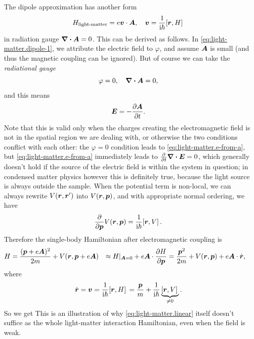 \documentclass[hyperref, a4paper, 12pt]{report}
\newcommand*{\ii}{\mathrm{i}}
\def\\{}%
\begin{document}
The dipole approximation has another form
\begin{equation}
    H_{\text{light-matter}} = e \vb*{v} \cdot \vb*{A}, 
    \quad \vb*{v} = \frac{1}{\ii \hbar} \comm*{\vb*{r}}{H} 
\end{equation}
in radiation gauge $\div{\vb*{A}} = 0$.
This can be derived as follows. 
In \eqref{eq:light-matter.dipole-1}, 
we attribute the electric field to $\varphi$, 
and assume $\vb*{A}$ is small (and thus the magnetic coupling can be ignored).
But of course we can take the \emph{radiational gauge} 
\begin{equation}
    \varphi = 0, \quad \div{\vb*{A}} = 0,
\end{equation} 
and this means 
\begin{equation}
    \vb*{E} = - \pdv{\vb*{A}}{t}.
    \label{eq:light-matter.e-from-a}
\end{equation}
Note that this is valid only when 
the charges creating the electromagnetic field 
is not in the spatial region we are dealing with,
or otherwise the two conditions conflict with each other: 
the $\varphi = 0$ condition leads to \eqref{eq:light-matter.e-from-a}, 
but \eqref{eq:light-matter.e-from-a} immediately leads to $\pdv{t} \div{\vb*{E}} = 0$, 
which generally doesn't hold if the source of the electric field 
is within the system in question; 
in condensed matter physics however this is definitely true, 
because the light source is always outside the sample.
When the potential term is non-local, 
we can always rewrite $V(\vb*{r}, \vb*{r}')$
into $V(\vb*{r}, \vb*{p})$,
and with appropriate normal ordering, we have 
\[
    \pdv{\vb*{p}} V(\vb*{r}, \vb*{p}) = \frac{1}{\ii \hbar} \comm*{\vb*{r}}{V}.
\]
Therefore the single-body Hamiltonian after electromagnetic coupling is 
\[
    \begin{aligned}
        H &= \frac{(\vb*{p} + e \vb*{A})^2}{2m} 
            + V(\vb*{r} , \vb*{p} + e \vb*{A}) \\
        &\approx H|_{\vb*{A} = 0} + 
            e \vb*{A} \cdot \pdv{H}{\vb*{p}} \\
        &= \frac{\vb*{p}^2}{2m} + V(\vb*{r}, \vb*{p}) + e \vb*{A} \cdot \dot{\vb*{r}},
    \end{aligned}
\]
where 
\begin{equation}
    \dot{\vb*{r}} = \vb*{v} = \frac{1}{\ii \hbar} \comm*{\vb*{r}}{H} 
    = \frac{\vb*{p}}{m} 
    + \frac{1}{\ii \hbar} \underbrace{\comm*{\vb*{r}}{V}}_{\neq 0}.
\end{equation}
So we get 
This is an illustration of 
why \eqref{eq:light-matter.linear} itself 
doesn't suffice as the whole light-matter interaction Hamiltonian, 
even when the field is weak.
\end{document}
